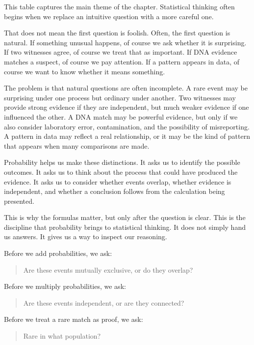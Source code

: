 \documentclass[
  letterpaper,
  DIV=11,
  numbers=noendperiod]{scrreprt}
\begin{document}
This table captures the main theme of the chapter. Statistical thinking
often begins when we replace an intuitive question with a more careful
one.

That does not mean the first question is foolish. Often, the first
question is natural. If something unusual happens, of course we ask
whether it is surprising. If two witnesses agree, of course we treat
that as important. If DNA evidence matches a suspect, of course we pay
attention. If a pattern appears in data, of course we want to know
whether it means something.

The problem is that natural questions are often incomplete. A rare event
may be surprising under one process but ordinary under another. Two
witnesses may provide strong evidence if they are independent, but much
weaker evidence if one influenced the other. A DNA match may be powerful
evidence, but only if we also consider laboratory error, contamination,
and the possibility of misreporting. A pattern in data may reflect a
real relationship, or it may be the kind of pattern that appears when
many comparisons are made.

Probability helps us make these distinctions. It asks us to identify the
possible outcomes. It asks us to think about the process that could have
produced the evidence. It asks us to consider whether events overlap,
whether evidence is independent, and whether a conclusion follows from
the calculation being presented.

This is why the formulas matter, but only after the question is clear.
This is the discipline that probability brings to statistical thinking.
It does not simply hand us answers. It gives us a way to inspect our
reasoning.

Before we add probabilities, we ask:

\begin{quote}
Are these events mutually exclusive, or do they overlap?
\end{quote}

Before we multiply probabilities, we ask:

\begin{quote}
Are these events independent, or are they connected?
\end{quote}

Before we treat a rare match as proof, we ask:

\begin{quote}
Rare in what population?
\end{quote}
\end{document}
